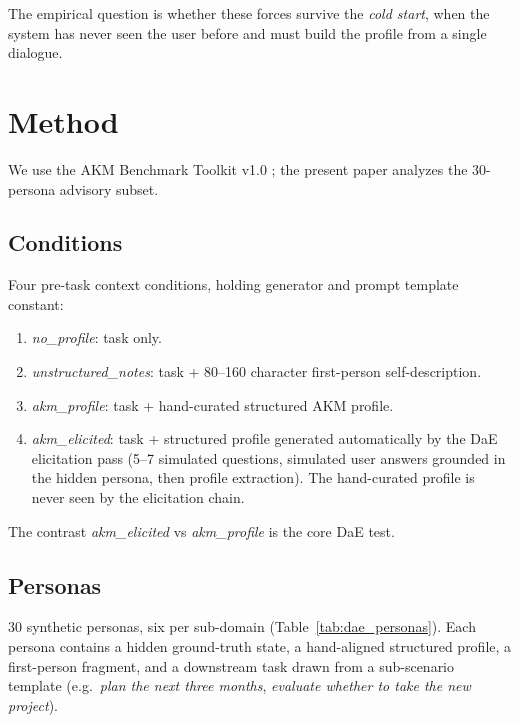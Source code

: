 \documentclass[11pt]{article}
\begin{document}
The empirical question is whether these forces survive the \emph{cold start}, when the system has never seen the user before and must build the profile from a single dialogue.

\section{Method}
\label{sec:method}

We use the AKM Benchmark Toolkit v1.0 \citep{shao2026akm}; the present paper analyzes the 30-persona advisory subset.

\subsection{Conditions}

Four pre-task context conditions, holding generator and prompt template constant:

\begin{enumerate}[leftmargin=1.5em]
\item \textit{no\_profile}: task only.
\item \textit{unstructured\_notes}: task + 80--160 character first-person self-description.
\item \textit{akm\_profile}: task + hand-curated structured AKM profile.
\item \textit{akm\_elicited}: task + structured profile generated automatically by the DaE elicitation pass (5--7 simulated questions, simulated user answers grounded in the hidden persona, then profile extraction). The hand-curated profile is never seen by the elicitation chain.
\end{enumerate}

The contrast \textit{akm\_elicited} vs \textit{akm\_profile} is the core DaE test.

\subsection{Personas}

30 synthetic personas, six per sub-domain (Table~\ref{tab:dae_personas}). Each persona contains a hidden ground-truth state, a hand-aligned structured profile, a first-person fragment, and a downstream task drawn from a sub-scenario template (e.g.\ \emph{plan the next three months}, \emph{evaluate whether to take the new project}).
\end{document}
